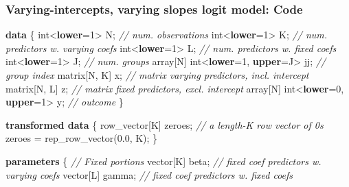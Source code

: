 \documentclass[
  11pt,
]{article}
\newenvironment{Shaded}{\begin{snugshade}}{\end{snugshade}}
\newcommand{\CommentTok}[1]{\textcolor[rgb]{0.56,0.35,0.01}{\textit{#1}}}
\newcommand{\DataTypeTok}[1]{\textcolor[rgb]{0.13,0.29,0.53}{#1}}
\newcommand{\DecValTok}[1]{\textcolor[rgb]{0.00,0.00,0.81}{#1}}
\newcommand{\FloatTok}[1]{\textcolor[rgb]{0.00,0.00,0.81}{#1}}
\newcommand{\KeywordTok}[1]{\textcolor[rgb]{0.13,0.29,0.53}{\textbf{#1}}}
\newcommand{\NormalTok}[1]{#1}
\begin{document}
\hypertarget{varying-intercepts-varying-slopes-logit-model-code}{%
\subsubsection{Varying-intercepts, varying slopes logit model: Code}\label{varying-intercepts-varying-slopes-logit-model-code}}

\begin{Shaded}
\begin{Highlighting}[]
\KeywordTok{data}\NormalTok{ \{}
  \DataTypeTok{int}\NormalTok{\textless{}}\KeywordTok{lower}\NormalTok{=}\DecValTok{1}\NormalTok{\textgreater{} N;                      }\CommentTok{// num. observations}
  \DataTypeTok{int}\NormalTok{\textless{}}\KeywordTok{lower}\NormalTok{=}\DecValTok{1}\NormalTok{\textgreater{} K;                      }\CommentTok{// num. predictors w. varying coefs}
  \DataTypeTok{int}\NormalTok{\textless{}}\KeywordTok{lower}\NormalTok{=}\DecValTok{1}\NormalTok{\textgreater{} L;                      }\CommentTok{// num. predictors w. fixed coefs}
  \DataTypeTok{int}\NormalTok{\textless{}}\KeywordTok{lower}\NormalTok{=}\DecValTok{1}\NormalTok{\textgreater{} J;                      }\CommentTok{// num. groups}
  \DataTypeTok{array}\NormalTok{[N] }\DataTypeTok{int}\NormalTok{\textless{}}\KeywordTok{lower}\NormalTok{=}\DecValTok{1}\NormalTok{, }\KeywordTok{upper}\NormalTok{=J\textgreater{} jj;   }\CommentTok{// group index}
  \DataTypeTok{matrix}\NormalTok{[N, K] x;                      }\CommentTok{// matrix varying predictors, incl. intercept}
  \DataTypeTok{matrix}\NormalTok{[N, L] z;                      }\CommentTok{// matrix fixed predictors, excl. intercept}
  \DataTypeTok{array}\NormalTok{[N] }\DataTypeTok{int}\NormalTok{\textless{}}\KeywordTok{lower}\NormalTok{=}\DecValTok{0}\NormalTok{, }\KeywordTok{upper}\NormalTok{=}\DecValTok{1}\NormalTok{\textgreater{} y;    }\CommentTok{// outcome}
\NormalTok{\}}

\KeywordTok{transformed data}\NormalTok{ \{}
  \DataTypeTok{row\_vector}\NormalTok{[K] zeroes;               }\CommentTok{// a length{-}K row vector of 0\textquotesingle{}s}
\NormalTok{  zeroes = rep\_row\_vector(}\FloatTok{0.0}\NormalTok{, K);}
\NormalTok{\}}

\KeywordTok{parameters}\NormalTok{ \{}
  \CommentTok{// Fixed portions}
  \DataTypeTok{vector}\NormalTok{[K] beta;      }\CommentTok{// fixed coef predictors w. varying coefs}
  \DataTypeTok{vector}\NormalTok{[L] gamma;     }\CommentTok{// fixed coef predictors w. fixed coefs}
  

\end{Highlighting}
\end{Shaded}
\end{document}
